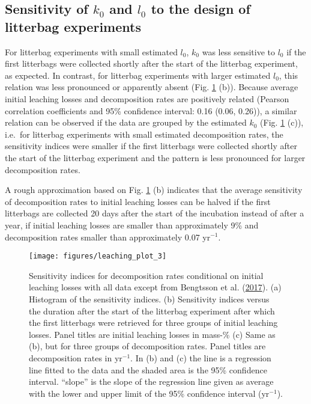 \documentclass[
  12pt,
]{article}
\begin{document}
\hypertarget{out-res-3}{%
\subsection{\texorpdfstring{Sensitivity of \(k_0\) and \(l_0\) to the design of litterbag experiments}{Sensitivity of k\_0 and l\_0 to the design of litterbag experiments}}\label{out-res-3}}

For litterbag experiments with small estimated \(l_0\), \(k_0\) was less sensitive to \(l_0\) if the first litterbags were collected shortly after the start of the litterbag experiment, as expected. In contrast, for litterbag experiments with larger estimated \(l_0\), this relation was less pronounced or apparently absent (Fig. \ref{fig:out-sdm-ua1-p1-p2} (b)). Because average initial leaching losses and decomposition rates are positively related (Pearson correlation coefficients and 95\% confidence interval: 0.16 (0.06, 0.26)), a similar relation can be observed if the data are grouped by the estimated \(k_0\) (Fig. \ref{fig:out-sdm-ua1-p1-p2} (c)), i.e.~for litterbag experiments with small estimated decomposition rates, the sensitivity indices were smaller if the first litterbags were collected shortly after the start of the litterbag experiment and the pattern is less pronounced for larger decomposition rates.

A rough approximation based on Fig. \ref{fig:out-sdm-ua1-p1-p2} (b) indicates that the average sensitivity of decomposition rates to initial leaching losses can be halved if the first litterbags are collected 20 days after the start of the incubation instead of after a year, if initial leaching losses are smaller than approximately 9\% and decomposition rates smaller than approximately 0.07 yr\(^{-1}\).



\begin{figure}[H]

{\centering \texttt{[image: figures/leaching\_plot\_3]} 

}

\caption{Sensitivity indices for decomposition rates conditional on initial leaching losses with all data except from Bengtsson et al. (\protect\hyperlink{ref-Bengtsson.2017}{2017}). (a) Histogram of the sensitivity indices. (b) Sensitivity indices versus the duration after the start of the litterbag experiment after which the first litterbags were retrieved for three groups of initial leaching losses. Panel titles are initial leaching losses in mass-\% (c) Same as (b), but for three groups of decomposition rates. Panel titles are decomposition rates in yr\(^{-1}\). In (b) and (c) the line is a regression line fitted to the data and the shaded area is the 95\% confidence interval. ``slope'' is the slope of the regression line given as average with the lower and upper limit of the 95\% confidence interval (yr\(^{-1}\)).}\label{fig:out-sdm-ua1-p1-p2}
\end{figure}
\end{document}
